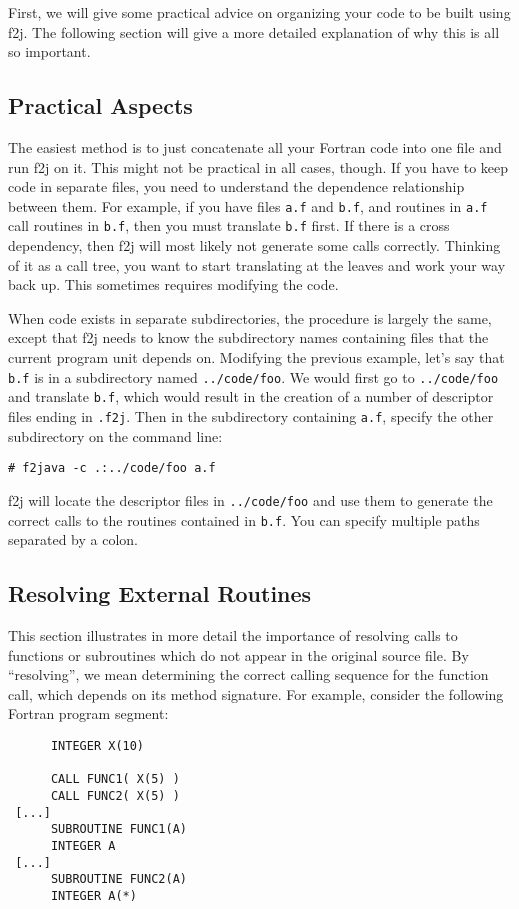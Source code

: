 \documentclass[11pt]{article}
\begin{document}
First, we will give some practical advice on organizing your code to be built
using f2j.  The following section will give a more detailed explanation of
why this is all so important.

\subsection{Practical Aspects}

The easiest method is to just concatenate all your Fortran code into one file
and run f2j on it.  This might not be practical in all cases, though.  If you have
to keep code in separate files, you need to understand the dependence relationship
between them.  For example, if you have files \verb|a.f| and \verb|b.f|, and
routines in \verb|a.f| call routines in \verb|b.f|, then you must translate
\verb|b.f| first.  If there is a cross dependency, then f2j will most likely
not generate some calls correctly.  Thinking of it as a call tree, you want
to start translating at the leaves and work your way back up.  This sometimes
requires modifying the code.

When code exists in separate subdirectories, the procedure is largely the same,
except that f2j needs to know the subdirectory names containing files that the
current program unit depends on.  Modifying the previous example, let's say
that \verb|b.f| is in a subdirectory named \verb|../code/foo|.  We would first
go to \verb|../code/foo| and translate \verb|b.f|, which would result in the 
creation of a number of descriptor files ending in \verb|.f2j|.  Then in the subdirectory
containing \verb|a.f|, specify the other subdirectory on the command line:
\begin{verbatim}
# f2java -c .:../code/foo a.f
\end{verbatim}
f2j will locate the descriptor files in \verb|../code/foo| and use them to
generate the correct calls to the routines contained in \verb|b.f|.  You can
specify multiple paths separated by a colon.

\subsection{Resolving External Routines}
This section illustrates in more detail the importance of resolving calls to functions
or subroutines which do not appear in the original source file.
By ``resolving'', we mean determining the correct
calling sequence for the function call, which
depends on its method signature.  For example, consider
the following Fortran program segment:
\begin{verbatim}
      INTEGER X(10)

      CALL FUNC1( X(5) )
      CALL FUNC2( X(5) )
 [...]
      SUBROUTINE FUNC1(A)
      INTEGER A
 [...]
      SUBROUTINE FUNC2(A)
      INTEGER A(*)
\end{verbatim}
\end{document}
